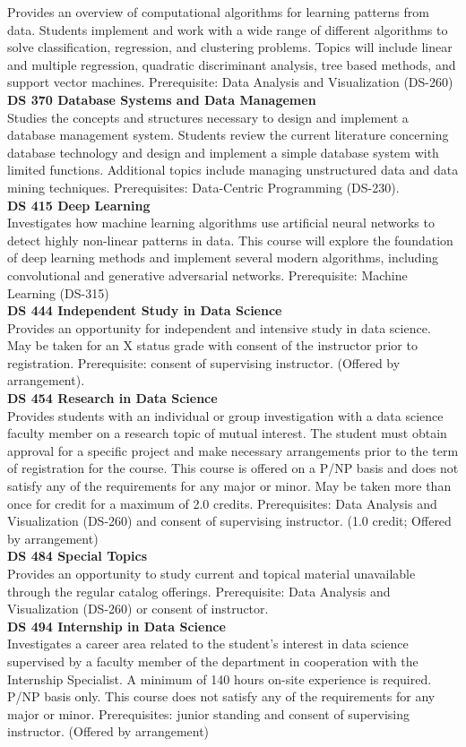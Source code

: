 \documentclass[
  letterpaper,
]{scrbook}
\begin{document}
Provides an overview of computational algorithms for learning patterns
from data. Students implement and work with a wide range of different
algorithms to solve classification, regression, and clustering problems.
Topics will include linear and multiple regression, quadratic
discriminant analysis, tree based methods, and support vector machines.
Prerequisite: Data Analysis and Visualization (DS-260)\\
\textbf{DS 370 Database Systems and Data Managemen}\\
Studies the concepts and structures necessary to design and implement a
database management system. Students review the current literature
concerning database technology and design and implement a simple
database system with limited functions. Additional topics include
managing unstructured data and data mining techniques. Prerequisites:
Data-Centric Programming (DS-230).\\
\textbf{DS 415 Deep Learning}\\
Investigates how machine learning algorithms use artificial neural
networks to detect highly non-linear patterns in data. This course will
explore the foundation of deep learning methods and implement several
modern algorithms, including convolutional and generative adversarial
networks. Prerequisite: Machine Learning (DS-315)\\
\textbf{DS 444 Independent Study in Data Science}\\
Provides an opportunity for independent and intensive study in data
science. May be taken for an X status grade with consent of the
instructor prior to registration. Prerequisite: consent of supervising
instructor. (Offered by arrangement).\\
\textbf{DS 454 Research in Data Science}\\
Provides students with an individual or group investigation with a data
science faculty member on a research topic of mutual interest. The
student must obtain approval for a specific project and make necessary
arrangements prior to the term of registration for the course. This
course is offered on a P/NP basis and does not satisfy any of the
requirements for any major or minor. May be taken more than once for
credit for a maximum of 2.0 credits. Prerequisites: Data Analysis and
Visualization (DS-260) and consent of supervising instructor. (1.0
credit; Offered by arrangement)\\
\textbf{DS 484 Special Topics}\\
Provides an opportunity to study current and topical material
unavailable through the regular catalog offerings. Prerequisite: Data
Analysis and Visualization (DS-260) or consent of instructor.\\
\textbf{DS 494 Internship in Data Science}\\
Investigates a career area related to the student's interest in data
science supervised by a faculty member of the department in cooperation
with the Internship Specialist. A minimum of 140 hours on-site
experience is required. P/NP basis only. This course does not satisfy
any of the requirements for any major or minor. Prerequisites: junior
standing and consent of supervising instructor. (Offered by arrangement)
\end{document}
